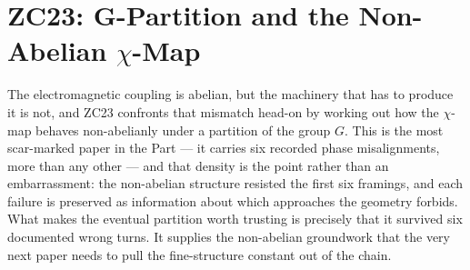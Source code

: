 \documentclass[12pt, a4paper]{article}
\begin{document}
\section{ZC23: G-Partition and the Non-Abelian $\chi$-Map}
\label{sec:zc23-g-partition}

The electromagnetic coupling is abelian, but the machinery that has to produce it
is not, and ZC23 confronts that mismatch head-on by working out how the $\chi$-map
behaves non-abelianly under a partition of the group $G$. This is the most
scar-marked paper in the Part --- it carries six recorded phase misalignments,
more than any other --- and that density is the point rather than an embarrassment:
the non-abelian structure resisted the first six framings, and each failure is
preserved as information about which approaches the geometry forbids. What makes
the eventual partition worth trusting is precisely that it survived six documented
wrong turns. It supplies the non-abelian groundwork that the very next paper needs
to pull the fine-structure constant out of the chain.

\end{document}
